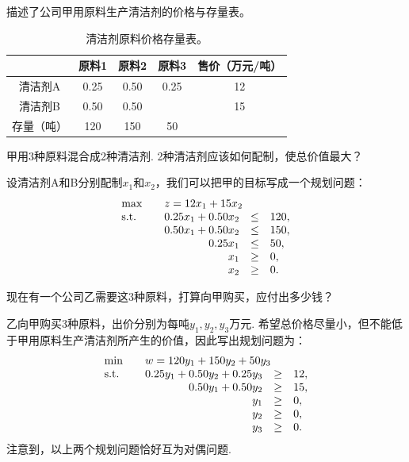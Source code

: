 \begin{example}[线性规划的经济学解释]
 描述了公司甲用原料生产清洁剂的价格与存量表。
\begin{table}
        \centering
        \begin{tabular}{c|ccc|c}
        \hline
                 & 原料1&原料2&原料3&售价（万元/吨） \\
                 \hline
             清洁剂A  & 0.25&0.50&0.25&12 \\
             清洁剂B & 0.50&0.50& &15\\
             \hline
             存量（吨）&120&150&50& \\
             \hline
        \end{tabular}
        \caption{清洁剂原料价格存量表。}
        \label{tab:cleaner}
\end{table}

甲用3种原料混合成2种清洁剂. 2种清洁剂应该如何配制，使总价值最大？

设清洁剂A和B分别配制$x_1$和$x_2$，我们可以把甲的目标写成一个规划问题：
\begin{align*}
\begin{array}{lrcl}
\max\quad&\multicolumn{3}{l}{z=12x_1+15x_2}\\
\text{s.t.}\quad&0.25x_1+0.50x_2&\le&120,\\
&0.50x_1+0.50x_2&\le&150,\\
&0.25x_1&\le& 50,\\
&x_1&\ge& 0,\\
&x_2&\ge& 0.
\end{array}
\end{align*}

现在有一个公司乙需要这3种原料，打算向甲购买，应付出多少钱？

乙向甲购买3种原料，出价分别为每吨$y_1,y_2,y_3$万元. 希望总价格尽量小，但不能低于甲用原料生产清洁剂所产生的价值，因此写出规划问题为：
\[
 \begin{array}{lrcl}
\min\quad&\multicolumn{3}{l}{w=120y_1+150y_2+50y_3} \\
\text{s.t.}\quad& 0.25y_1+0.50y_2+0.25y_3&\ge&12,\\
&0.50y_1+0.50y_2&\ge&15,\\
&y_1&\ge&0,\\
&y_2&\ge&0,\\
&y_3&\ge&0.
 \end{array}
\]
注意到，以上两个规划问题恰好互为对偶问题.
\end{example}

